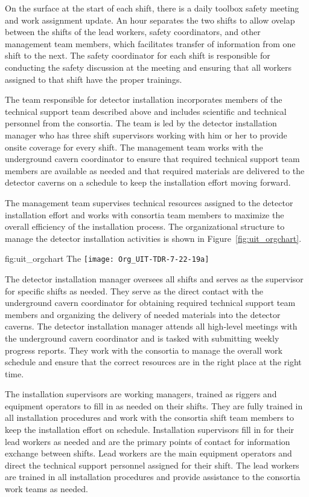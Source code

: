 On the surface at the start of each shift, there is a daily 
toolbox safety meeting and work assignment update. An hour 
separates the two shifts to allow ovelap between the shifts 
of the lead workers, safety coordinators, and other management 
team members, which facilitates transfer of information 
from one shift to the next. The safety coordinator for each shift 
is responsible for conducting the safety discussion at the 
meeting and ensuring that all workers assigned to that shift 
have the proper trainings.

The team responsible for detector installation incorporates 
members of the technical support team described above 
and includes scientific and technical personnel from 
the  consortia.  The team is led by the detector
installation manager who has three shift supervisors working 
with him or her to provide onsite coverage for every shift.
The management team works with the underground cavern
coordinator to ensure that required technical support team 
members are available as needed and that required materials 
are delivered to the detector caverns on a schedule to keep
the installation effort moving forward.         

The management team supervises technical resources assigned to 
the detector installation effort and works with consortia 
team members to maximize the overall efficiency of the installation 
process.  The organizational structure to manage the detector 
installation activities is shown in Figure~\ref{fig:uit_orgchart}.
\begin{dunefigure}{fig:uit_orgchart}
  {The }
  \texttt{[image: Org\_UIT-TDR-7-22-19a]}
\end{dunefigure}

The detector installation manager oversees all shifts and serves as
the supervisor for specific shifts as needed.  They serve as the
direct contact with the underground cavern coordinator for obtaining
required technical support team members and organizing the delivery of
needed materials into the detector caverns.  The detector installation
manager attends all high-level meetings with the underground cavern
coordinator and is tasked with submitting weekly progress reports.
They work with the  consortia to manage the overall work
schedule and ensure that the correct resources are in the right place
at the right time.
    
The installation supervisors are working managers, trained as 
riggers and equipment operators to fill in as needed on their 
shifts.  They are fully trained in all installation procedures
and work with the consortia shift team members to keep the 
installation effort on schedule.  Installation supervisors 
fill in for their lead workers as needed and are the primary 
points of contact for information exchange 
between shifts.  Lead workers are the main equipment operators 
and direct the technical support personnel assigned for their 
shift.  The lead workers are trained in all installation 
procedures and provide assistance to the consortia work teams 
as needed.  

